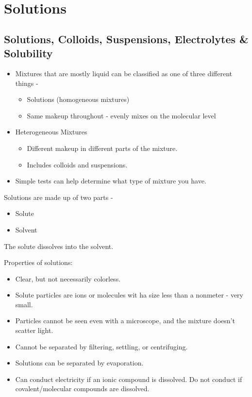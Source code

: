 \documentclass[../hchem.tex]{subfiles}
\begin{document}
\chapter{Solutions}
\section{Solutions, Colloids, Suspensions, Electrolytes \& Solubility}
\begin{itemize}
    \item Mixtures that are mostly liquid can be classified as one of three different things - 
    \begin{itemize}
        \item Solutions (homogeneous mixtures)
        \item Same makeup throughout - evenly mixes on the molecular level 
    \end{itemize}

    \item Heterogeneous Mixtures
    \begin{itemize}
        \item Different makeup in different parts of the mixture.
        \item Includes colloids and suspensions.
    \end{itemize}
    \item Simple tests can help determine what type of mixture you have.
\end{itemize}

Solutions are made up of two parts -
\begin{itemize}
    \item Solute 
    \item Solvent
\end{itemize}

The solute dissolves into the solvent.

Properties of solutions:
\begin{itemize}
    \item Clear, but not necessarily colorless.
    \item Solute particles are ions or molecules wit ha size less than a nonmeter - very small.
    \item Particles cannot be seen even with a microscope, and the mixture doesn't scatter light.
    \item Cannot be separated by filtering, settling, or centrifuging.
    \item Solutions can be separated by evaporation.
    \item Can conduct electricity if an ionic compound is dissolved. Do not conduct if covalent/molecular compounds are dissolved.
\end{itemize}
\end{document}
